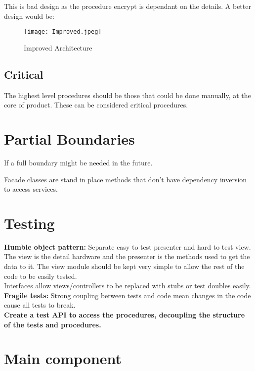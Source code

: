 \documentclass[11pt]{scrartcl} %
\begin{document}
This is bad design as the procedure encrypt is dependant on the details. A better design would be:

\begin{figure}[h] %
	\centering
	\texttt{[image: Improved.jpeg]} %
	\caption{Improved Architecture}
\end{figure}

\subsection{Critical}

The highest level procedures should be those that could be done manually, at the core of product.
These can be considered critical procedures.

\section{Partial Boundaries}

If a full boundary might be needed in the future.

Facade classes are stand in place methods that don't have dependency inversion to access services.

\section{Testing}

\textbf{Humble object pattern:} Separate easy to test presenter and hard to test view.\\

The view is the detail hardware and the presenter is the methods used to get the data to it. The view
module should be kept very simple to allow the rest of the code to be easily tested.\\

Interfaces allow views/controllers to be replaced with stubs or test doubles easily.\\

\textbf{Fragile tests:} Strong coupling between tests and code mean changes in the code cause all tests to break.\\

\textbf{Create a test API to access the procedures, decoupling the structure of the tests and procedures.}

\section{Main component}
\end{document}
